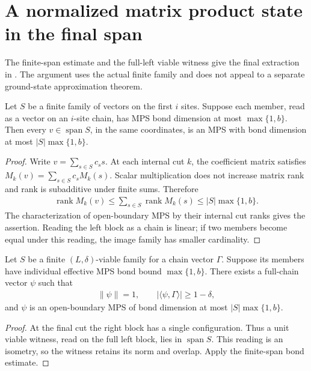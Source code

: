 \section{A normalized matrix product state in the final span}
\label{sec:lvv_final_mps}

The finite-span estimate and the full-left viable witness give the final extraction
in \cite{Landau2015Polynomial}. The argument uses the actual finite family and
does not appeal to a separate ground-state approximation theorem.

\begin{lemma}
    \label{thm:lvv_left_span_bond}
    \leanok
    Let $S$ be a finite family of vectors on the first $i$ sites. Suppose each
    member, read as a vector on an $i$-site chain, has MPS bond dimension at most
    $\max\{1,b\}$. Then every $v\in\operatorname{span}S$, in the same coordinates,
    is an MPS with bond dimension at most $|S|\max\{1,b\}$.
\end{lemma}
\begin{proof}
    \leanok
    Write $v=\sum_{s\in S}c_ss$. At each internal cut $k$, the coefficient
    matrix satisfies $M_k(v)=\sum_{s\in S}c_sM_k(s)$. Scalar multiplication
    does not increase matrix rank and rank is subadditive under finite sums.
    Therefore
    \begin{align}
        \operatorname{rank}M_k(v)
        \le\sum_{s\in S}\operatorname{rank}M_k(s)
        \le|S|\max\{1,b\}.
    \end{align}
    The characterization of open-boundary MPS by their internal cut ranks gives
    the assertion. Reading the left block as a chain is linear; if two members
    become equal under this reading, the image family has smaller cardinality.
\end{proof}

\begin{lemma}
    \label{thm:lvv_final_span_mps}
    \leanok
    Let $S$ be a finite $(L,\delta)$-viable family for a chain vector $\Gamma$.
    Suppose its members have individual effective MPS bond bound $\max\{1,b\}$.
    There exists a full-chain vector $\psi$ such that
    \begin{align}
        \|\psi\|=1,\qquad
        |\langle\psi,\Gamma\rangle|\ge1-\delta,
    \end{align}
    and $\psi$ is an open-boundary MPS of bond dimension at most
    $|S|\max\{1,b\}$.
\end{lemma}
\begin{proof}
    \leanok
    At the final cut the right block has a single configuration. Thus a unit
    viable witness, read on the full left block, lies in $\operatorname{span}S$.
    This reading is an isometry, so the witness retains its norm and overlap.
    Apply the finite-span bond estimate.
\end{proof}

